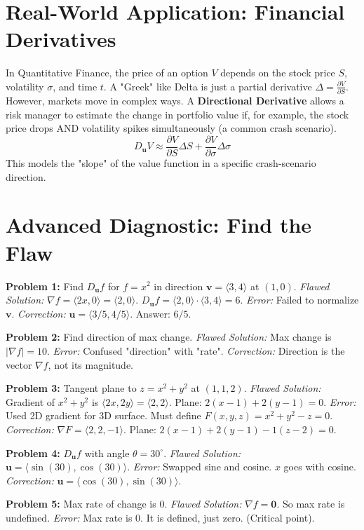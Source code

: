 \documentclass{article}
\begin{document}
\section{Real-World Application: Financial Derivatives}
In Quantitative Finance, the price of an option $V$ depends on the stock price $S$, volatility $\sigma$, and time $t$.
A "Greek" like Delta is just a partial derivative $\Delta = \frac{\partial V}{\partial S}$.
However, markets move in complex ways. A \textbf{Directional Derivative} allows a risk manager to estimate the change in portfolio value if, for example, the stock price drops AND volatility spikes simultaneously (a common crash scenario).
\[ D_{\mathbf{u}}V \approx \frac{\partial V}{\partial S} \Delta S + \frac{\partial V}{\partial \sigma} \Delta \sigma \]
This models the "slope" of the value function in a specific crash-scenario direction.

\section{Advanced Diagnostic: Find the Flaw}

\textbf{Problem 1:} Find $D_{\mathbf{u}}f$ for $f=x^2$ in direction $\mathbf{v}=\langle 3, 4 \rangle$ at $(1, 0)$.
\textit{Flawed Solution:} $\nabla f = \langle 2x, 0 \rangle = \langle 2, 0 \rangle$. $D_{\mathbf{u}}f = \langle 2, 0 \rangle \cdot \langle 3, 4 \rangle = 6$.
\textit{Error:} Failed to normalize $\mathbf{v}$.
\textit{Correction:} $\mathbf{u} = \langle 3/5, 4/5 \rangle$. Answer: $6/5$.

\textbf{Problem 2:} Find direction of max change.
\textit{Flawed Solution:} Max change is $|\nabla f| = 10$.
\textit{Error:} Confused "direction" with "rate".
\textit{Correction:} Direction is the vector $\nabla f$, not its magnitude.

\textbf{Problem 3:} Tangent plane to $z = x^2+y^2$ at $(1,1,2)$.
\textit{Flawed Solution:} Gradient of $x^2+y^2$ is $\langle 2x, 2y \rangle = \langle 2, 2 \rangle$. Plane: $2(x-1)+2(y-1)=0$.
\textit{Error:} Used 2D gradient for 3D surface. Must define $F(x, y, z) = x^2+y^2-z=0$.
\textit{Correction:} $\nabla F = \langle 2, 2, -1 \rangle$. Plane: $2(x-1)+2(y-1)-1(z-2)=0$.

\textbf{Problem 4:} $D_{\mathbf{u}}f$ with angle $\theta=30^\circ$.
\textit{Flawed Solution:} $\mathbf{u} = \langle \sin(30), \cos(30) \rangle$.
\textit{Error:} Swapped sine and cosine. $x$ goes with cosine.
\textit{Correction:} $\mathbf{u} = \langle \cos(30), \sin(30) \rangle$.

\textbf{Problem 5:} Max rate of change is 0.
\textit{Flawed Solution:} $\nabla f = \mathbf{0}$. So max rate is undefined.
\textit{Error:} Max rate is 0. It is defined, just zero. (Critical point).
\end{document}
